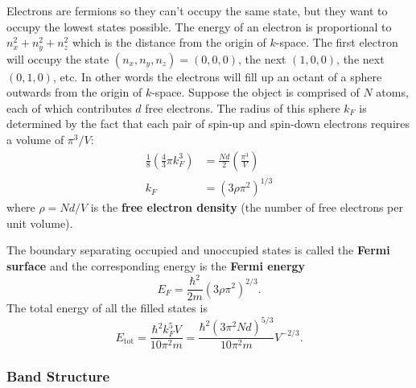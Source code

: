 \documentclass{article}
\begin{document}
\begin{itemize}
        Electrons are fermions so they can't occupy the same state, but they want to occupy the lowest states possible. The energy of an electron is proportional to $n_x^2 + n_y^2 + n_z^2$ which is the distance from the origin of $k$-space. The first electron will occupy the state $(n_x, n_y, n_z) = (0, 0, 0)$, the next $(1, 0, 0)$, the next $(0, 1, 0)$, etc. In other words the electrons will fill up an octant of a sphere outwards from the origin of $k$-space. Suppose the object is comprised of $N$ atoms, each of which contributes $d$ free electrons. The radius of this sphere $k_F$ is determined by the fact that each pair of spin-up and spin-down electrons requires a volume of $\pi^3 / V$: \begin{align*}
          \frac{1}{8} \left( \frac{4}{3} \pi k_F^3 \right) & = \frac{N d}{2} \left( \frac{\pi^3}{V} \right) \\
          k_F                                              & = (3 \rho \pi^2)^{1 / 3}
        \end{align*} where $\rho = N d / V$ is the \textbf{free electron density} (the number of free electrons per unit volume).

        The boundary separating occupied and unoccupied states is called the \textbf{Fermi surface} and the corresponding energy is the \textbf{Fermi energy} \[E_F = \frac{\hbar^2}{2 m} (3 \rho \pi^2)^{2 / 3}.\] The total energy of all the filled states is \[E_\text{tot} = \frac{\hbar^2 k_F^5 V}{10 \pi^2 m} = \frac{\hbar^2 (3 \pi^2 N d)^{5 / 3}}{10 \pi^2 m} V^{-2 / 3}.\]
\end{itemize}

\subsubsection{Band Structure}
\end{document}
